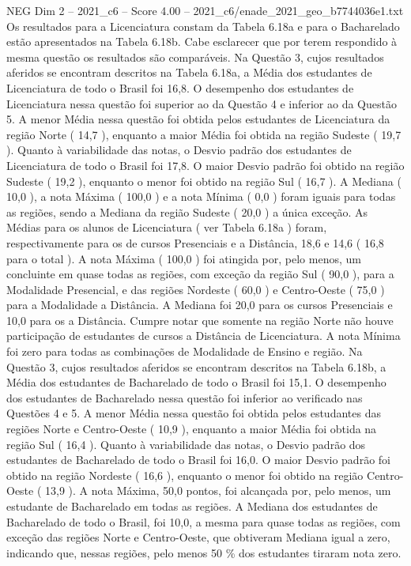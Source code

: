 \begin{textsample}{NEG Dim 2 – 2021\_c6 – Score 4.00 – 2021\_c6/enade\_2021\_geo\_b7744036e1.txt}
Os resultados para a Licenciatura constam da Tabela 6.18a e para o Bacharelado estão apresentados na Tabela 6.18b.
Cabe esclarecer que por terem respondido à mesma questão os resultados são comparáveis.
Na Questão 3, cujos resultados aferidos se encontram descritos na Tabela 6.18a, a Média dos estudantes de Licenciatura de todo o Brasil foi 16,8.
O desempenho dos estudantes de Licenciatura nessa questão foi superior ao da Questão 4 e inferior ao da Questão 5.
A menor Média nessa questão foi obtida pelos estudantes de Licenciatura da região Norte ( 14,7 ), enquanto a maior Média foi obtida na região Sudeste ( 19,7 ).
Quanto à variabilidade das notas, o Desvio padrão dos estudantes de Licenciatura de todo o Brasil foi 17,8.
O maior Desvio padrão foi obtido na região Sudeste ( 19,2 ), enquanto o menor foi obtido na região Sul ( 16,7 ).
A Mediana ( 10,0 ), a nota Máxima ( 100,0 ) e a nota Mínima ( 0,0 ) foram iguais para todas as regiões, sendo a Mediana da região Sudeste ( 20,0 ) a única exceção.
As Médias para os alunos de Licenciatura ( ver Tabela 6.18a ) foram, respectivamente para os de cursos Presenciais e a Distância, 18,6 e 14,6 ( 16,8 para o total ).
A nota Máxima ( 100,0 ) foi atingida por, pelo menos, um concluinte em quase todas as regiões, com exceção da região Sul ( 90,0 ), para a Modalidade Presencial, e das regiões Nordeste ( 60,0 ) e Centro-Oeste ( 75,0 ) para a Modalidade a Distância.
A Mediana foi 20,0 para os cursos Presenciais e 10,0 para os a Distância.
Cumpre notar que somente na região Norte não houve participação de estudantes de cursos a Distância de Licenciatura.
A nota Mínima foi zero para todas as combinações de Modalidade de Ensino e região.
Na Questão 3, cujos resultados aferidos se encontram descritos na Tabela 6.18b, a Média dos estudantes de Bacharelado de todo o Brasil foi 15,1.
O desempenho dos estudantes de Bacharelado nessa questão foi inferior ao verificado nas Questões 4 e 5.
A menor Média nessa questão foi obtida pelos estudantes das regiões Norte e Centro-Oeste ( 10,9 ), enquanto a maior Média foi obtida na região Sul ( 16,4 ).
Quanto à variabilidade das notas, o Desvio padrão dos estudantes de Bacharelado de todo o Brasil foi 16,0.
O maior Desvio padrão foi obtido na região Nordeste ( 16,6 ), enquanto o menor foi obtido na região Centro-Oeste ( 13,9 ).
A nota Máxima, 50,0 pontos, foi alcançada por, pelo menos, um estudante de Bacharelado em todas as regiões.
A Mediana dos estudantes de Bacharelado de todo o Brasil, foi 10,0, a mesma para quase todas as regiões, com exceção das regiões Norte e Centro-Oeste, que obtiveram Mediana igual a zero, indicando que, nessas regiões, pelo menos 50 \% dos estudantes tiraram nota zero.

\end{textsample}
